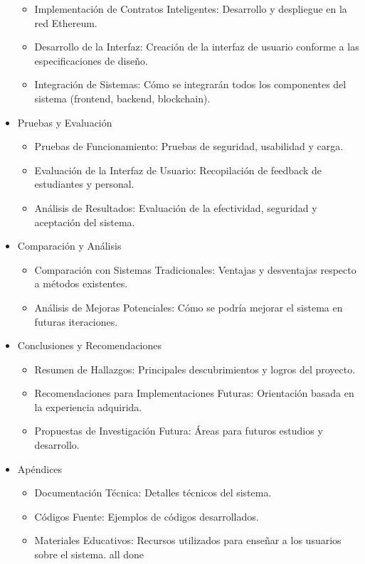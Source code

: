 \documentclass{report}
\begin{document}
\begin{itemize}
\begin{itemize}
			\item Implementación de Contratos Inteligentes: Desarrollo y despliegue en la red Ethereum.
			\item Desarrollo de la Interfaz: Creación de la interfaz de usuario conforme a las especificaciones de diseño.
			\item Integración de Sistemas: Cómo se integrarán todos los componentes del sistema (frontend, backend, blockchain).
		\end{itemize}
		\item Pruebas y Evaluación
		\begin{itemize}
			\item Pruebas de Funcionamiento: Pruebas de seguridad, usabilidad y carga.
			\item Evaluación de la Interfaz de Usuario: Recopilación de feedback de estudiantes y personal.
			\item Análisis de Resultados: Evaluación de la efectividad, seguridad y aceptación del sistema.
		\end{itemize}
		\item Comparación y Análisis
		\begin{itemize}
			\item Comparación con Sistemas Tradicionales: Ventajas y desventajas respecto a métodos existentes.
			\item Análisis de Mejoras Potenciales: Cómo se podría mejorar el sistema en futuras iteraciones.
		\end{itemize}
		\item Conclusiones y Recomendaciones
		\begin{itemize}
			\item Resumen de Hallazgos: Principales descubrimientos y logros del proyecto.
			\item Recomendaciones para Implementaciones Futuras: Orientación basada en la experiencia adquirida.
			\item Propuestas de Investigación Futura: Áreas para futuros estudios y desarrollo.
		\end{itemize}
		\item Apéndices
		\begin{itemize}
			\item Documentación Técnica: Detalles técnicos del sistema.
			\item Códigos Fuente: Ejemplos de códigos desarrollados.
			\item Materiales Educativos: Recursos utilizados para enseñar a los usuarios sobre el sistema. all done 
		\end{itemize}
	\end{itemize}
	
\end{document}
